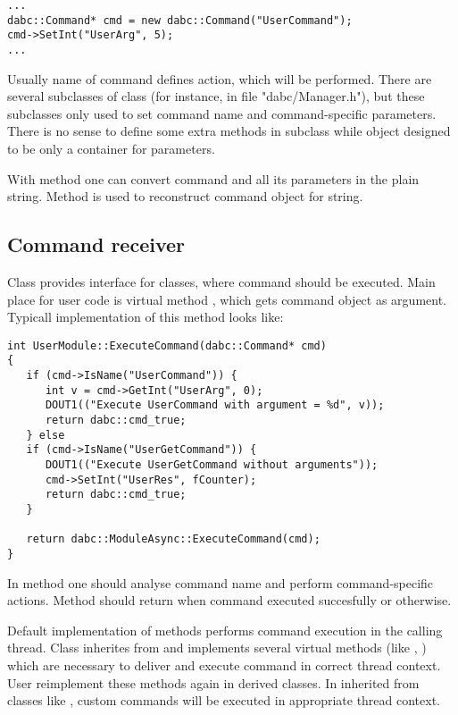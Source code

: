 \begin{small}
\begin{verbatim}
...
dabc::Command* cmd = new dabc::Command("UserCommand");
cmd->SetInt("UserArg", 5);
...
\end{verbatim}     
\end{small}
   
Usually name of command defines action, which will be performed.
There are several subclasses of  class (for instance, in
file "dabc/Manager.h"), but these subclasses only used to set command name and
command-specific parameters. There is no sense to define some extra methods
in subclass while  object designed to be only a container for 
parameters.

With method  one can convert command and all its parameters in
the plain string. Method  is used to reconstruct command object
for string.     


\subsection{Command receiver}

Class  provides interface for classes, where command should be
executed. Main place for user code is virtual method , which gets command 
object as argument. Typicall implementation of this method looks like:

\begin{small}
\begin{verbatim}
int UserModule::ExecuteCommand(dabc::Command* cmd)
{
   if (cmd->IsName("UserCommand")) {
      int v = cmd->GetInt("UserArg", 0);
      DOUT1(("Execute UserCommand with argument = %d", v));
      return dabc::cmd_true;
   } else
   if (cmd->IsName("UserGetCommand")) {
      DOUT1(("Execute UserGetCommand without arguments"));
      cmd->SetInt("UserRes", fCounter);
      return dabc::cmd_true;
   } 
      
   return dabc::ModuleAsync::ExecuteCommand(cmd);
}
\end{verbatim}     
\end{small}
 
In  method one should analyse command name and perform command-specific
actions. Method should return  when command executed 
succesfully or  otherwise.  

Default implementation of  methods performs command execution
in the calling thread. Class  inherites from 
and implements several virtual methods (like , ) 
which are necessary to deliver and execute command in correct thread context.
User  reimplement these methods again in derived classes.
In inherited from  classes like , 
custom commands will be executed in appropriate thread context.  

